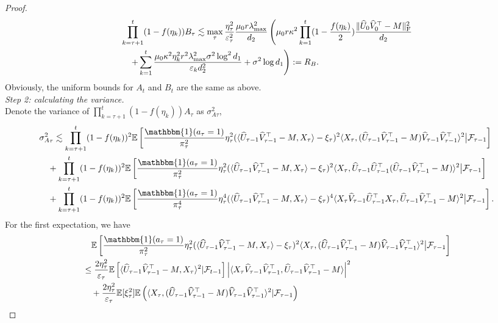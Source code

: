 \documentclass[12pt]{article}
\newcommand\fro[1]{\| #1 \|_{\rm{F}}}
\newcommand{\inp}[2]{\langle #1,#2\rangle}
\def\EE{{\mathbb E}}
\theoremstyle{plain}
\begin{document}
\begin{proof}
\begin{align*}
        &\prod_{k=\tau+1}^{t} (1-f(\eta_k))B_{\tau}\lesssim \max_{\tau}\frac{\eta_{\tau}^2}{\varepsilon_{\tau}^2}\frac{\mu_0r\lambda_{\max}^2}{d_2}\left(\mu_0r\kappa^2\prod_{k=1}^{t}(1-\frac{f(\eta_{k})}{2}) \frac{\fro{\widehat{U}_0\widehat{V}_0^{\top} - M}^2}{d_2} \right.\\ &\left.\quad +   \sum_{k=1}^{t}\frac{\mu_0\kappa^2\eta_k^2r^2\lambda_{\max}^2\sigma^2\log^2 d_1}{\varepsilon_k d_2^2} + \sigma^2\log d_1\right) :=R_{B}.
    \end{align*}
    Obviously, the uniform bounds for $A_t$ and $B_t$ are the same as above. \\
    \emph{Step 2: calculating the variance.} \\
    Denote the variance of $\prod_{k=\tau+1}^{t} (1-f(\eta_k)) A_{\tau}$ as $\sigma_{A\tau}^2$,
    \begin{align*}
        &\sigma_{A\tau}^2\lesssim \prod_{k=\tau+1}^{t} (1-f(\eta_k))^2\EE\left[\frac{\mathbbm{1}(a_\tau=1)}{\pi_{\tau}^2}\eta_{\tau}^2 (\inp{\widehat{U}_{\tau-1}\widehat{V}_{\tau-1}^{\top} - M}{X_{\tau}}-\xi_{\tau})^2\inp{X_{\tau}}{(\widehat{U}_{\tau-1}\widehat{V}_{\tau-1}^{\top} - M)\widehat{V}_{\tau-1}\widehat{V}_{\tau-1}^{\top}}^2\big|\mathcal{F}_{\tau-1}\right] \\ &\quad + \prod_{k=\tau+1}^{t} (1-f(\eta_k))^2\EE\left[\frac{\mathbbm{1}(a_\tau=1)}{\pi_{\tau}^2}\eta_{\tau}^2 (\inp{\widehat{U}_{\tau-1}\widehat{V}_{\tau-1}^{\top} - M}{X_{\tau}}-\xi_{\tau})^2\inp{X_{\tau}}{\widehat{U}_{\tau-1}\widehat{U}_{\tau-1}^{\top}(\widehat{U}_{\tau-1}\widehat{V}_{\tau-1}^{\top} - M)}^2\big|\mathcal{F}_{\tau-1}\right] \\ &\quad + \prod_{k=\tau+1}^{t} (1-f(\eta_k))^2 \EE\left[\frac{\mathbbm{1}(a_\tau=1)}{\pi_{\tau}^4}\eta_{\tau}^4 (\inp{\widehat{U}_{\tau-1}\widehat{V}_{\tau-1}^{\top} - M}{X_{\tau}}-\xi_{\tau})^4\inp{X_{\tau}\widehat{V}_{\tau-1}\widehat{U}_{\tau-1}^{\top}X_{\tau}}{\widehat{U}_{\tau-1}\widehat{V}_{\tau-1}^{\top} - M}^2\big|\mathcal{F}_{\tau-1}\right]. 
    \end{align*}
    For the first expectation, we have
    \begin{align*}
        &\quad \EE\left[\frac{\mathbbm{1}(a_{\tau}=1)}{\pi_{\tau}^2}\eta_{\tau}^2 (\inp{\widehat{U}_{\tau-1}\widehat{V}_{\tau-1}^{\top} - M}{X_{\tau}}-\xi_{\tau})^2\inp{X_{\tau}}{(\widehat{U}_{\tau-1}\widehat{V}_{\tau-1}^{\top} - M)\widehat{V}_{\tau-1}\widehat{V}_{\tau-1}^{\top}}^2\big|\mathcal{F}_{\tau-1}\right] \\
        &\leq \frac{2\eta_{\tau}^2}{\varepsilon_{\tau}}\EE\left[\inp{\widehat{U}_{\tau-1}\widehat{V}_{\tau-1}^{\top} - M}{X_{\tau}}^2|\mathcal{F}_{t-1}\right]\left|\inp{X_{\tau}\widehat{V}_{\tau-1}\widehat{V}_{\tau-1}^{\top}}{\widehat{U}_{\tau-1}\widehat{V}_{\tau-1}^{\top} - M}\right|^2 \\ &\quad + \frac{2\eta_{\tau}^2}{\varepsilon_{\tau}}\EE[\xi_{\tau}^2]\EE\left(\inp{X_{\tau}}{(\widehat{U}_{\tau-1}\widehat{V}_{\tau-1}^{\top} - M)\widehat{V}_{\tau-1}\widehat{V}_{\tau-1}^{\top}}^2|\mathcal{F}_{\tau-1}\right) \\

\end{align*}
\end{proof}
\end{document}
